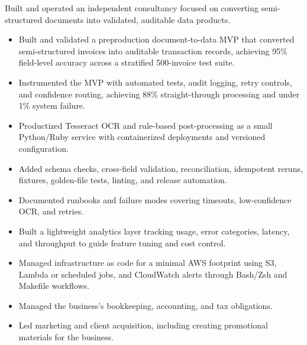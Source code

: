 Built and operated an independent consultancy focused on converting semi-structured documents into validated, auditable data products.
\begin{itemize}
  \item Built and validated a preproduction document-to-data MVP that converted semi-structured invoices into auditable transaction records, achieving 95\% field-level accuracy across a stratified 500-invoice test suite.
  \item Instrumented the MVP with automated tests, audit logging, retry controls, and confidence routing, achieving 88\% straight-through processing and under 1\% system failure.
  \item Productized Tesseract OCR and rule-based post-processing as a small Python/Ruby service with containerized deployments and versioned configuration.
  \item Added schema checks, cross-field validation, reconciliation, idempotent reruns, fixtures, golden-file tests, linting, and release automation.
  \item Documented runbooks and failure modes covering timeouts, low-confidence OCR, and retries.
  \item Built a lightweight analytics layer tracking usage, error categories, latency, and throughput to guide feature tuning and cost control.
  \item Managed infrastructure as code for a minimal AWS footprint using S3, Lambda or scheduled jobs, and CloudWatch alerts through Bash/Zsh and Makefile workflows.
  \item Managed the business's bookkeeping, accounting, and tax obligations.
  \item Led marketing and client acquisition, including creating promotional materials for the business.
\end{itemize}

